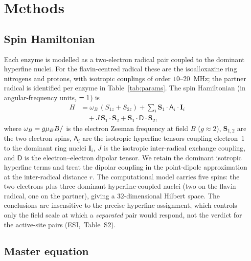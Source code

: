 \documentclass[twoside,twocolumn,9pt]{article}
\let\hbar\relax
\DeclareRobustCommand{\hbar}{{\mathchar'26\mkern-9mu h}}
\begin{document}
\section{Methods}

\subsection{Spin Hamiltonian}

Each enzyme is modelled as a two-electron radical pair coupled to the dominant
hyperfine nuclei. For the flavin-centred radical these are the isoalloxazine
ring nitrogens and protons, with isotropic couplings of order $10$--$20$~MHz;
the partner radical is identified per enzyme in Table~\ref{tab:params}. The spin
Hamiltonian (in angular-frequency units, $\hbar = 1$) is
\begin{align}
H &= \omega_B\,(S_{1z}+S_{2z})
   + \sum_{i} \mathbf{S}_1\!\cdot\! \mathsf{A}_i \!\cdot\! \mathbf{I}_i
   \nonumber\\
  &\quad
   + J\,\mathbf{S}_1\!\cdot\!\mathbf{S}_2
   + \mathbf{S}_1\!\cdot\! \mathsf{D}\!\cdot\! \mathbf{S}_2 ,
\label{eq:H}
\end{align}
where $\omega_B = g\mu_B B/\hbar$ is the electron Zeeman frequency at field $B$
($g\approx2$), $\mathbf{S}_{1,2}$ are the two electron spins, $\mathsf{A}_i$ are
the isotropic hyperfine tensors coupling electron~1 to the dominant ring nuclei
$\mathbf{I}_i$, $J$ is the isotropic inter-radical exchange coupling, and
$\mathsf{D}$ is the electron--electron dipolar tensor. We retain the dominant
isotropic hyperfine terms and treat the dipolar coupling in the point-dipole
approximation at the inter-radical distance $r$. The computational model carries
five spins: the two electrons plus three dominant hyperfine-coupled nuclei (two
on the flavin radical, one on the partner), giving a $32$-dimensional Hilbert
space. The conclusions are insensitive to the precise hyperfine assignment,
which controls only the field scale at which a \emph{separated} pair would
respond, not the verdict for the active-site pairs (ESI,\dag~Table~S2).

\subsection{Master equation}
\end{document}
